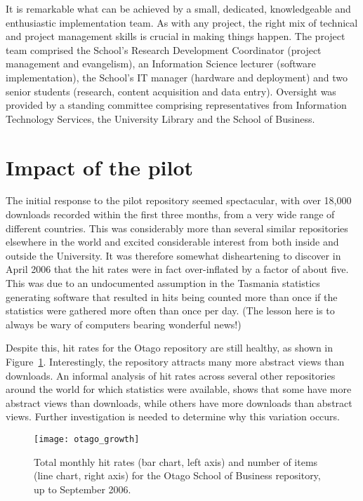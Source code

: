 \documentclass[12pt,pdftex,a4paper,titlepage]{article}
\begin{document}
It is remarkable what can be achieved by a small, dedicated, knowledgeable and enthusiastic implementation team. As with any project, the right mix of technical and project management skills is crucial in making things happen. The project team comprised the School's Research Development Coordinator (project management and evangelism), an Information Science lecturer (software implementation), the School's IT manager (hardware and deployment) and two senior students (research, content acquisition and data entry). Oversight was provided by a standing committee comprising representatives from Information Technology Services, the University Library and the School of Business.


\section{Impact of the pilot}

The initial response to the pilot repository seemed spectacular, with over 18,000 downloads recorded within the first three months, from a very wide range of different countries. This was considerably more than several similar repositories elsewhere in the world and excited considerable interest from both inside and outside the University. It was therefore somewhat disheartening to discover in April 2006 that the hit rates were in fact over-inflated by a factor of about five. This was due to an undocumented assumption in the Tasmania statistics generating software \cite{Sale-A-2006-stats} that resulted in hits being counted more than once if the statistics were gathered more often than once per day. (The lesson here is to always be wary of computers bearing wonderful news!)

Despite this, hit rates for the Otago repository are still healthy, as shown in Figure~\ref{fig-otago-growth}. Interestingly, the repository attracts many more abstract views than downloads. An informal analysis of hit rates across several other repositories around the world for which statistics were available, shows that some have more abstract views than downloads, while others have more downloads than abstract views. Further investigation is needed to determine why this variation occurs.


\begin{figure}
	\centering
	\texttt{[image: otago\_growth]}
	\caption{Total monthly hit rates (bar chart, left axis) and number of items (line chart, right axis) for the Otago School of Business repository, up to September 2006.}
	\label{fig-otago-growth}
\end{figure}
\end{document}
